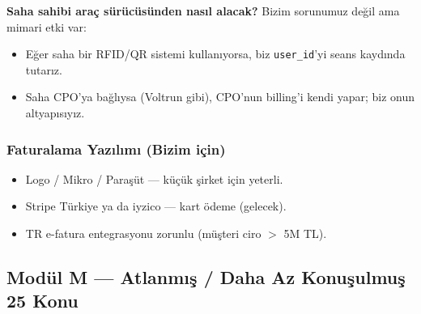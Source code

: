 \documentclass[11pt,a4paper]{article}
\begin{document}
\textbf{Saha sahibi araç sürücüsünden nasıl alacak?} Bizim sorunumuz değil ama mimari etki var:
\begin{itemize}
    \item Eğer saha bir RFID/QR sistemi kullanıyorsa, biz \texttt{user\_id}'yi seans kaydında tutarız.
    \item Saha CPO'ya bağlıysa (Voltrun gibi), CPO'nun billing'i kendi yapar; biz onun altyapısıyız.
\end{itemize}

\subsubsection{Faturalama Yazılımı (Bizim için)}
\begin{itemize}
    \item Logo / Mikro / Paraşüt — küçük şirket için yeterli.
    \item Stripe Türkiye ya da iyzico — kart ödeme (gelecek).
    \item TR e-fatura entegrasyonu zorunlu (müşteri ciro $>$ 5M TL).
\end{itemize}

\subsection{Modül M — Atlanmış / Daha Az Konuşulmuş 25 Konu}
\end{document}
